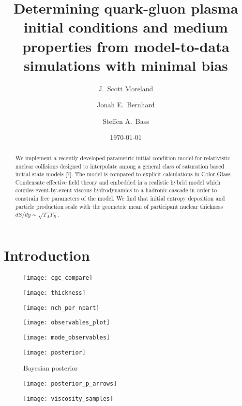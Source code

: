 \documentclass[aps,prc,reprint,amsmath]{revtex4-1}
\begin{document}
\title{Determining quark-gluon plasma initial conditions and medium \\ properties from model-to-data simulations with minimal bias}

\author{J.\ Scott Moreland}
\author{Jonah E.\ Bernhard}
\author{Steffen A.\ Bass}

\date{\today}


\begin{abstract}
  We implement a recently developed parametric initial condition model for relativistic nuclear collisions designed to interpolate among a general class of saturation based initial state models [?]. The model is compared to explicit calculations in Color-Glass Condensate effective field theory and embedded in a realistic hybrid model which couples event-by-event viscous hydrodynamics to a hadronic cascade in order to constrain free parameters of the model. We find that initial entropy deposition and particle production scale with the geometric mean of participant nuclear thickness $dS/dy \sim \sqrt{T_A T_B}$. 
\end{abstract}


\maketitle


\section{Introduction}

\begin{figure*}
    \texttt{[image: cgc\_compare]}
\end{figure*}

\begin{figure}[b]
    \texttt{[image: thickness]}
\end{figure}

\begin{figure}
    \texttt{[image: nch\_per\_npart]}
\end{figure}

\begin{figure*}
    \texttt{[image: observables\_plot]}
\end{figure*}

\begin{figure*}
    \texttt{[image: mode\_observables]}
\end{figure*}

\begin{figure*}
    \texttt{[image: posterior]}
    \caption{Bayesian posterior}
\end{figure*}

\begin{figure}
    \centering
    \texttt{[image: posterior\_p\_arrows]}
\end{figure}

\begin{figure}
    \texttt{[image: viscosity\_samples]}
\end{figure}


\end{document}
